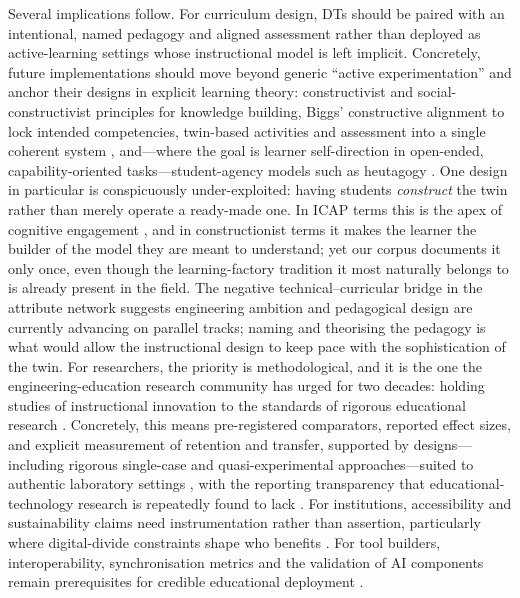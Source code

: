 Several implications follow. For curriculum design, DTs should be paired with an
intentional, named pedagogy and aligned assessment rather than deployed as
active-learning settings whose instructional model is left implicit. Concretely,
future implementations should move beyond generic ``active experimentation'' and
anchor their designs in explicit learning theory: constructivist and
social-constructivist principles for knowledge building, Biggs' constructive
alignment to lock intended competencies, twin-based activities and assessment into
a single coherent system \cite{biggs_enhancing_1996}, and---where the goal is learner
self-direction in open-ended, capability-oriented tasks---student-agency models such
as heutagogy \cite{blaschke_heutagogy_2012}. One design in particular is conspicuously
under-exploited: having students \emph{construct} the twin rather than merely operate a
ready-made one. In ICAP terms this is the apex of cognitive engagement
\cite{chi_icap_2014}, and in constructionist terms it makes the learner the builder of
the model they are meant to understand; yet our corpus documents it only once,
even though the learning-factory tradition it most naturally belongs to is already
present in the field. The negative technical--curricular bridge
in the attribute network suggests engineering ambition and pedagogical design are
currently advancing on parallel tracks; naming and theorising the pedagogy is what
would allow the instructional design to keep pace with the sophistication of the
twin. For
researchers, the priority is methodological, and it is the one the
engineering-education research community has urged for two decades: holding studies
of instructional innovation to the standards of rigorous educational research
\cite{streveler_conducting_2006}. Concretely, this means
pre-registered comparators, reported effect sizes, and explicit measurement of
retention and transfer, supported by designs---including rigorous single-case and
quasi-experimental approaches---suited to authentic laboratory settings
\cite{dayo_evaluating_2024}, with the reporting transparency that educational-technology
research is repeatedly found to lack \cite{demir_analyzing_2025}. For institutions,
accessibility and sustainability claims need instrumentation rather than
assertion, particularly where digital-divide constraints shape who benefits
\cite{eltaiba_benefits_2025}. For tool builders,
interoperability, synchronisation metrics and the validation of AI components
remain prerequisites for credible educational deployment \cite{chen_ai-enhanced_2025}.

